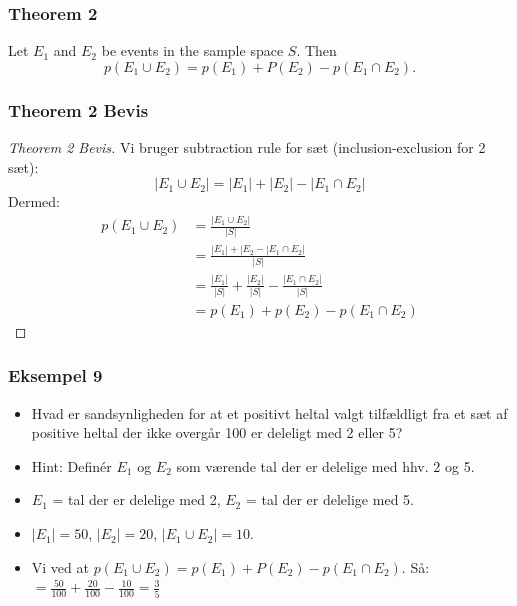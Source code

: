 \documentclass{beamer}
\begin{document}
\begin{frame}
  \frametitle{Theorem 2}
  \begin{theorem}
    Let $E_{1}$ and $E_{2}$ be events in the sample space $S$. Then $$p(E_{1} \cup E_{2}) = p(E_{1})+P(E_{2})-p(E_{1} \cap E_{2}).$$
  \end{theorem} 
\end{frame}

\begin{frame}
  \frametitle{Theorem 2 Bevis}
  \begin{proof}[Theorem 2 Bevis]
    Vi bruger subtraction rule for sæt (inclusion-exclusion for 2 sæt):
    $$|E_{1} \cup E_{2}| = |E_{1}| + |E_{2}| - |E_{1} \cap E_{2}|$$
    Dermed:
    \begin{equation*}
      \begin{split}
        p(E_{1} \cup E_{2}) &= \frac{|E_{1} \cup E_{2}|}{|S|}\\
                         &= \frac{|E_{1}|+|E_{2}-|E_{1}\cap E_{2}|}{|S|}\\
                         &= \frac{|E_{1}|}{|S|} + \frac{|E_{2}|}{|S|}- \frac{|E_{1} \cap E_{2}|}{|S|}\\
                         &= p(E_{1})+p(E_{2})-p(E_{1} \cap E_{2})
      \end{split}
    \end{equation*}
  \end{proof}
\end{frame}

\begin{frame}
  \frametitle{Eksempel 9}
  \begin{itemize}
  \item<1-> Hvad er sandsynligheden for at et positivt heltal valgt tilfældligt fra et sæt af positive heltal der ikke overgår 100 er deleligt med 2 eller 5?
  \item<1-> Hint: Definér $E_{1}$ og $E_{2}$ som værende tal der er delelige med hhv. 2 og 5.
  \item<2-> $E_{1}$ = tal der er delelige med 2, $E_{2}$ = tal der er delelige med 5.
  \item<3-> $|E_{1}| = 50$, $|E_{2}| = 20$, $|E_{1} \cup E_{2}| = 10$.
  \item<3-> Vi ved at $p(E_{1}\cup E_{2})=p(E_{1})+P(E_{2})-p(E_{1} \cap E_{2})$. Så: $= \frac{50}{100}+ \frac{20}{100}- \frac{10}{100} = \frac{3}{5}$
    
  \end{itemize} 
\end{frame}
\end{document}
